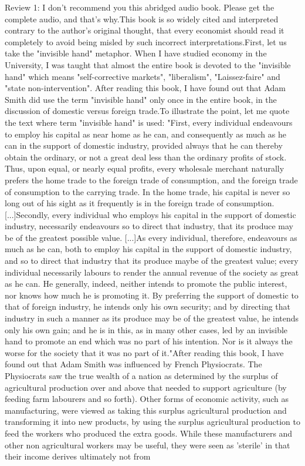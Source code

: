 \documentclass[12pt, a4paper[]{article}
\begin{document}
\begin{itemize}
    {\fontsize{9pt}{11pt}\selectfont
    \item Review 1: I don't recommend you this abridged audio book. Please get the complete audio, and that's why.This book is so widely cited and interpreted contrary to the author's original thought, that every economist should read it completely to avoid being misled by such incorrect interpretations.First, let us take the "invisible hand" metaphor. When I have studied economy in the University, I was taught that almost the entire book is devoted to the "invisible hand" which means "self-corrective markets", "liberalism", "Laissez-faire" and "state non-intervention". After reading this book, I have found out that Adam Smith did use the term "invisible hand" only once in the entire book, in the discussion of domestic versus foreign trade.To illustrate the point, let me quote the text where term "invisible hand" is used: "First, every individual endeavours to employ his capital as near home as he can, and consequently as much as he can in the support of domestic industry, provided always that he can thereby obtain the ordinary, or not a great deal less than the ordinary profits of stock. Thus, upon equal, or nearly equal profits, every wholesale merchant naturally prefers the home trade to the foreign trade of consumption, and the foreign trade of consumption to the carrying trade. In the home trade, his capital is never so long out of his sight as it frequently is in the foreign trade of consumption. [...]Secondly, every individual who employs his capital in the support of domestic industry, necessarily endeavours so to direct that industry, that its produce may be of the greatest possible value. [...]As every individual, therefore, endeavours as much as he can, both to employ his capital in the support of domestic industry, and so to direct that industry that its produce maybe of the greatest value; every individual necessarily labours to render the annual revenue of the society as great as he can. He generally, indeed, neither intends to promote the public interest, nor knows how much he is promoting it. By preferring the support of domestic to that of foreign industry, he intends only his own security; and by directing that industry in such a manner as its produce may be of the greatest value, he intends only his own gain; and he is in this, as in many other cases, led by an invisible hand to promote an end which was no part of his intention. Nor is it always the worse for the society that it was no part of it."After reading this book, I have found out that Adam Smith was influenced by French Physiocrats. The Physiocrats saw the true wealth of a nation as determined by the surplus of agricultural production over and above that needed to support agriculture (by feeding farm labourers and so forth). Other forms of economic activity, such as manufacturing, were viewed as taking this surplus agricultural production and transforming it into new products, by using the surplus agricultural production to feed the workers who produced the extra goods. While these manufacturers and other non agricultural workers may be useful, they were seen as 'sterile' in that their income derives ultimately not from }
\end{itemize}
\end{document}
